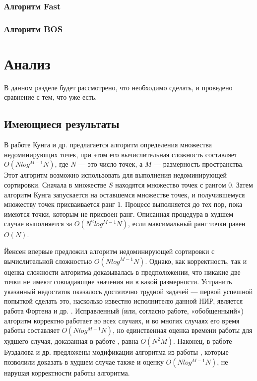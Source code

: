 \subsubsection{Алгоритм Fast}
\subsubsection{Алгоритм BOS}

\section{Анализ}

В данном разделе будет рассмотрено, что необходимо сделать, и проведено сравнение с тем, что уже есть.

\subsection{Имеющиеся результаты}
В работе Кунга и др. \cite{Kung} предлагается алгоритм определения множества недоминирующих точек, при этом его вычислительная сложность составляет $O(N log^{M-1} N)$, где $N$ — это число точек, а $M$ — размерность пространства. Этот алгоритм возможно использовать для выполнения недоминирующей сортировки. Сначала в множестве $S$ находятся множество точек с рангом $0$. Затем алгоритм Кунга запускается на оставшемся множестве точек, и получившемуся множеству точек присваивается ранг $1$. Процесс выполняется до тех пор, пока имеются точки, которым не присвоен ранг. Описанная процедура в худшем случае выполняется за $O(N^2 log^{M-1} N)$, если максимальный ранг точки равен $O(N)$.

Йенсен \cite{Jensen} впервые предложил алгоритм недоминирующей сортировки с вычислительной сложностью $O(N log^{M-1} N)$. Однако, как корректность, так и оценка сложности алгоритма доказывалась в предположении, что никакие две точки не имеют совпадающие значения ни в какой размерности. Устранить указанный недостаток оказалось достаточно трудной задачей — первой успешной попыткой сделать это, насколько известно исполнителю данной НИР, является работа Фортена и др. \cite{Forton}. Исправленный (или, согласно работе, «обобщенныий») алгоритм корректно работает во всех случаях, и во многих случаях его время работы составляет $O(N log^{M-1} N)$, но единственная оценка времени работы для худшего случая, доказанная в работе \cite{Jensen}, равна $O(N^2M)$. Наконец, в работе Буздалова и др. \cite{Buzdalov} предложены модификации алгоритма из работы \cite{Jensen}, которые позволили доказать в худшем случае также и оценку $O(N log^{M-1} N)$, не нарушая корректности работы алгоритма.

